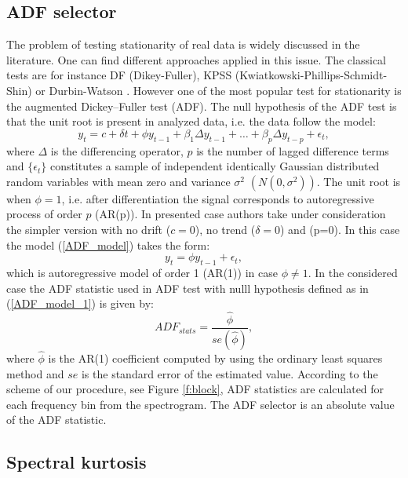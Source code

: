 \documentclass[11pt]{article}
\begin{document}
\subsection{ADF selector}
The problem of testing stationarity of real data is widely discussed in the literature. One can find different approaches applied in this issue. The classical tests are for instance DF (Dikey-Fuller), KPSS (Kwiatkowski-Phillips-Schmidt-Shin) or Durbin-Watson 
\cite{dickey1979distribution,kwiatkowski1992testing,durbin1951testing}. However one of the most popular test for stationarity is the augmented Dickey–Fuller test (ADF). The null hypothesis of the ADF test is that the unit root is present in analyzed data, i.e. the data follow the model:
\begin{equation}
    \label{ADF_model}
    y_t=c+\delta t + \phi y_{t-1} + \beta _1 \Delta y_{t-1} + \dots +  \beta _p \Delta y_{t-p} + \epsilon _t,
\end{equation}
where $\Delta$ is the differencing operator, $p$ is the number of lagged difference terms and $
\{\epsilon _t\}$ constitutes a sample of independent identically Gaussian distributed random variables with mean zero and variance $\sigma^2$ $ \left( N(0,\sigma^2) \right) $. The unit root is when $\phi=1$, i.e. after differentiation the signal corresponds to autoregressive process of order $p$ (AR(p)).
In presented case authors take under consideration the simpler version with no drift ($c=0$), no trend ($\delta=0$) and (p=0). In this case the model (\ref{ADF_model}) takes the form:
\begin{equation}
    \label{ADF_model_1}
    y_t=\phi y_{t-1} + \epsilon _t,
\end{equation}
which is  autoregressive model of order 1 (AR(1)) in case $\phi \neq 1$.  In the considered case the ADF statistic used in ADF test with nulll hypothesis defined as in (\ref{ADF_model_1}) is given by:
\begin{equation}
    \label{ADF_stats}
  ADF_{stats}= \frac{ \hat{\phi} }{ se(\hat{\phi}) },
\end{equation}
where $\hat{\phi}$ is the AR(1) coefficient computed by using the ordinary least squares method and $se$ is the standard error of the estimated value. According to the scheme of our procedure, see Figure \ref{f:block}, ADF statistics are calculated for each frequency bin from the spectrogram. The ADF selector is an absolute value of the ADF statistic. 

\subsection{Spectral kurtosis}
\end{document}
